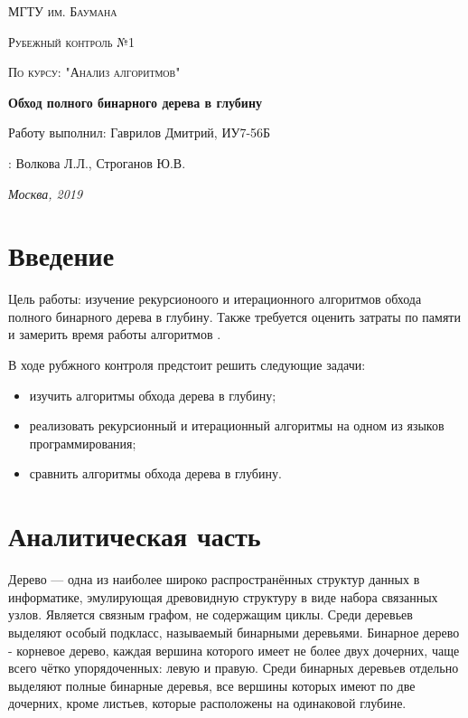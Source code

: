 \documentclass[12pt]{report}
\begin{document}
\begin{titlepage}
	\centering
	{\scshape\LARGE МГТУ им. Баумана \par}
	\vspace{3cm}
	{\scshape\Large Рубежный контроль №1\par}
	\vspace{0.5cm}	
	{\scshape\Large По курсу: "Анализ алгоритмов"\par}
	\vspace{1.5cm}
	{\huge\bfseries Обход полного бинарного дерева в глубину\par}
	\vspace{2cm}
	\Large Работу выполнил: Гаврилов Дмитрий, ИУ7-56Б\par
	\vspace{0.5cm}
	:  Волкова Л.Л., Строганов Ю.В.\par

	\vfill
	\large \textit {Москва, 2019} \par
\end{titlepage}

\tableofcontents

\newpage
\chapter*{Введение}
Цель работы: изучение рекурсионоого и итерационного алгоритмов обхода полного бинарного дерева в глубину.  Также требуется оценить затраты по памяти и замерить время работы алгоритмов .


В ходе рубжного контроля предстоит решить следующие задачи:
\begin{itemize}
	\item изучить алгоритмы обхода дерева в глубину; 
	\item реализовать рекурсионный и итерационный алгоритмы на одном из языков программирования;  
	\item сравнить алгоритмы обхода дерева в глубину.
\end{itemize}



\chapter{Аналитическая часть}
Дерево — одна из наиболее широко распространённых структур данных в информатике, эмулирующая древовидную структуру в виде набора связанных узлов. Является связным графом, не содержащим циклы. Среди деревьев выделяют особый подкласс, называемый бинарными деревьями. Бинарное дерево - корневое дерево, каждая вершина которого имеет не более двух дочерних, чаще всего чётко упорядоченных: левую и правую. Среди бинарных деревьев отдельно выделяют полные бинарные деревья, все вершины которых имеют по две дочерних, кроме листьев, которые расположены на одинаковой глубине.
	    
\end{document}

